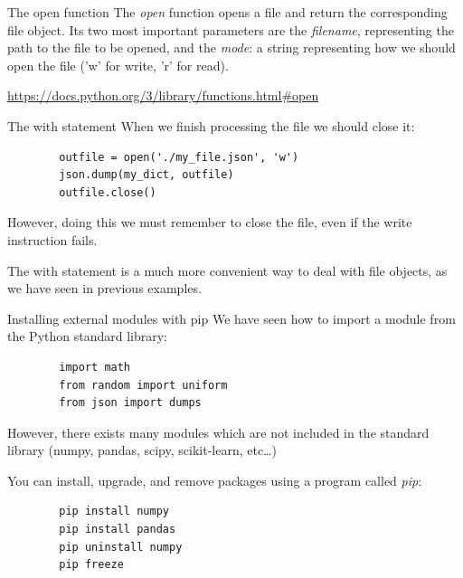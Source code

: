 \documentclass[aspectratio=169,handout]{beamer}
\begin{document}
\begin{frame}[fragile]{The open function}
    The \emph{open} function opens a file and return the corresponding file object.
    Its two most important parameters are the \emph{filename}, representing the path to the file to be opened, and the
    \emph{mode}: a string representing how we should open the file ('w' for write, 'r' for read).

    \url{https://docs.python.org/3/library/functions.html#open}
\end{frame}

\begin{frame}[fragile]{The with statement}
    When we finish processing the file we should close it:
    \begin{verbatim}
        outfile = open('./my_file.json', 'w')
        json.dump(my_dict, outfile)
        outfile.close()
    \end{verbatim}
    However, doing this we must remember to close the file, even if the write instruction fails.

    The with statement is a much more convenient way to deal with file objects, as we have seen in previous examples.
\end{frame}



\begin{frame}[fragile]{Installing external modules with pip}
    We have seen how to import a module from the Python standard library:
    \begin{verbatim}
        import math
        from random import uniform
        from json import dumps
    \end{verbatim}

    However, there exists many modules which are not included in the standard library (numpy, pandas, scipy,
    scikit-learn, etc\ldots)

    You can install, upgrade, and remove packages using a program called \emph{pip}:
    \begin{verbatim}
        pip install numpy
        pip install pandas
        pip uninstall numpy
        pip freeze
    \end{verbatim}
\end{frame}
\end{document}
